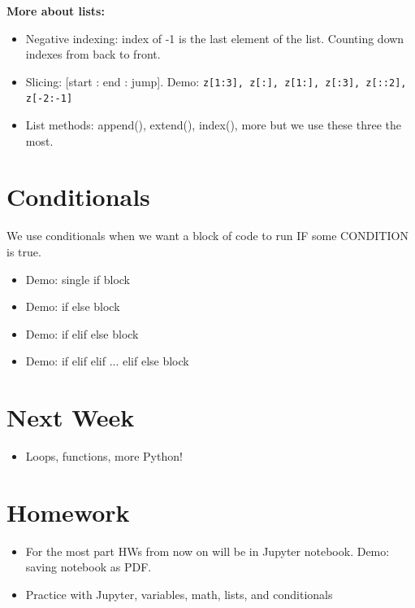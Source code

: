 \documentclass[12pt]{article}
\numberwithin{equation}{section}
\begin{document}
\textbf{More about lists:}
\begin{itemize}
    \item Negative indexing: index of -1 is the last element of the list. Counting down indexes from back to front.
    \item Slicing: [start : end : jump]. Demo: \verb|z[1:3], z[:], z[1:], z[:3], z[::2], z[-2:-1]|
    \item List methods: append(), extend(), index(), more but we use these three the most.
\end{itemize}

\section{Conditionals}
We use conditionals when we want a block of code to run IF some CONDITION is true.
\begin{itemize}
    \item Demo: single if block
    \item Demo: if else block
    \item Demo: if elif else block
    \item Demo: if elif elif ... elif else block
\end{itemize}

\section{Next Week}
\begin{itemize}
    \item Loops, functions, more Python!
\end{itemize}

\section{Homework}
\begin{itemize}
    \item For the most part HWs from now on will be in Jupyter notebook. Demo: saving notebook as PDF.
    \item Practice with Jupyter, variables, math, lists, and conditionals
\end{itemize}
\end{document}
